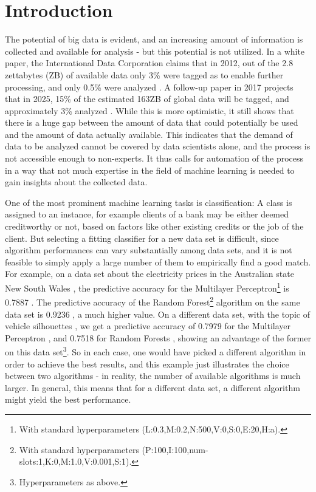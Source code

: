 \chapter{Introduction}
\label{sec:intro}

The potential of big data is evident, and an increasing amount of information is collected and available for analysis - but this potential is not utilized. In a white paper, the International Data Corporation claims that in 2012, out of the 2.8 zettabytes (ZB) of available data only 3\% were tagged as to enable further processing, and only 0.5\% were analyzed \cite{gantz2012the}. A follow-up paper in 2017 projects that in 2025, 15\% of the estimated 163ZB of global data will be tagged, and approximately 3\% analyzed \cite{gantz2017data}. While this is more optimistic, it still shows that there is a huge gap between the amount of data that could potentially be used and the amount of data actually available. This indicates that the demand of data to be analyzed cannot be covered by data scientists alone, and the process is not accessible enough to non-experts. It thus calls for automation of the process in a way that not much expertise in the field of machine learning is needed to gain insights about the collected data.

One of the most prominent machine learning tasks is classification: A class is assigned to an instance, for example clients of a bank may be either deemed creditworthy or not, based on factors like other existing credits or the job of the client. But selecting a fitting classifier for a new data set is difficult, since algorithm performances can vary substantially among data sets, and it is not feasible to simply apply a large number of them to empirically find a good match. For example, on a data set about the electricity prices in the Australian state New South Wales \cite{harris1999splice}, the predictive accuracy for the Multilayer Perceptron\footnote{With standard hyperparameters (L:0.3,M:0.2,N:500,V:0,S:0,E:20,H:a).} is 0.7887 \cite{cachada2017run3}. The predictive accuracy of the Random Forest\footnote{With standard hyperparameters (P:100,I:100,num-slots:1,K:0,M:1.0,V:0.001,S:1).} algorithm on the same data set is 0.9236 \cite{cachada2017run}, a much higher value. On a different data set, with the topic of vehicle silhouettes \cite{siebert1987vehicle}, we get a predictive accuracy of 0.7979 for the Multilayer Perceptron \cite{cachada2017run4}, and 0.7518 for Random Forests \cite{cachada2017run2}, showing an advantage of the former on this data set\footnote{Hyperparameters as above.}. So in each case, one would have picked a different algorithm in order to achieve the best results, and this example just illustrates the choice between two algorithms - in reality, the number of available algorithms is much larger. In general, this means that for a different data set, a different algorithm might yield the best performance.

